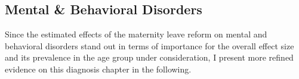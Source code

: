 \documentclass[11pt, a4paper,draft]{article} %
\begin{document}
\subsection{Mental \& Behavioral Disorders}
Since the estimated effects of the maternity leave reform on mental and behavioral disorders stand out in terms of importance for the overall effect size and its prevalence in the age group under consideration, I present more refined evidence on this diagnosis chapter in the following. %
\end{document}
